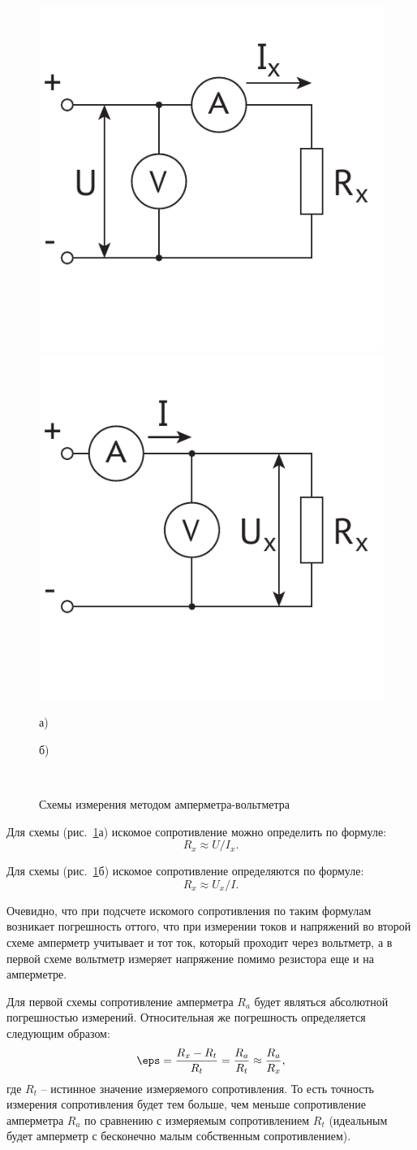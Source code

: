 \documentclass[pscyr]{hedwork}
\newcommand{\Pic}[1]{\ref{pic#1}}
\newcommand{\pic}[1]{рис.~\Pic{#1}}
\begin{document}
  \begin{figure}[!b]
    \center
    \includegraphics[width=.4\textwidth]{AVa} \hspace{2em}
    \includegraphics[width=.4\textwidth]{AVb} \\
    
    \vspace{-4em}
    \parbox{.4\textwidth}{\center а)} \hspace{2em}
    \parbox{.4\textwidth}{\center б)} \\
    \caption{Схемы измерения методом амперметра-вольтметра}
    \label{picAV}
  \end{figure}

  Для схемы (\pic{AV}а) искомое сопротивление можно определить по формуле:
  \[
    R_x \approx U / I_x.
  \]
  
  Для схемы (\pic{AV}б) искомое сопротивление определяются по формуле:
  \[
    R_x \approx U_x / I.
  \]
 
  Очевидно, что при подсчете искомого сопротивления по таким формулам возникает
  погрешность оттого, что при измерении токов и напряжений во второй схеме
  амперметр учитывает и тот ток, который проходит через вольтметр, а в первой
  схеме вольтметр измеряет напряжение помимо резистора еще и на амперметре.
  
  Для первой схемы сопротивление амперметра \( R_a \) будет являться абсолютной
  погрешностью измерений. Относительная же погрешность определяется следующим
  образом:
  \[
    \eps = \frac{R_x - R_t}{R_t} = \frac{R_a}{R_t} \approx \frac{R_a}{R_x},
  \]
  где \( R_t \) -- истинное значение измеряемого сопротивления. То есть точность
  измерения сопротивления будет тем больше, чем меньше сопротивление амперметра
  \( R_a \) по сравнению с измеряемым сопротивлением \( R_t \) (идеальным будет
  амперметр с бесконечно малым собственным сопротивлением).
  
\end{document}

